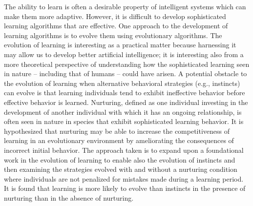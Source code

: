 The ability to learn is often a desirable property of intelligent systems which can make them more adaptive.
However, it is difficult to develop sophisticated learning algorithms that are effective.
One approach to the development of learning algorithms is to evolve them using evolutionary algorithms.
The evolution of learning is interesting as a practical matter because harnessing it may allow us to develop better artificial intelligence;
it is interesting also from a more theoretical perspective of understanding how the sophisticated learning seen in nature -- including that of humans -- could have arisen.
A potential obstacle to the evolution of learning when alternative behavioral strategies (e.g., instincts) can evolve is that learning individuals tend to exhibit ineffective behavior before effective behavior is learned.
Nurturing, defined as one individual investing in the development of another individual with which it has an ongoing relationship, is often seen in nature in species that exhibit sophisticated learning behavior.
It is hypothesized that nurturing may be able to increase the competitiveness of learning in an evolutionary environment by ameliorating the consequences of incorrect initial behavior.
The approach taken is to expand upon a foundational work in the evolution of learning to enable also the evolution of instincts and then examining the strategies evolved with and without a nurturing condition where individuals are not penalized for mistakes made during a learning period.
It is found that learning is more likely to evolve than instincts in the presence of nurturing than in the absence of nurturing.